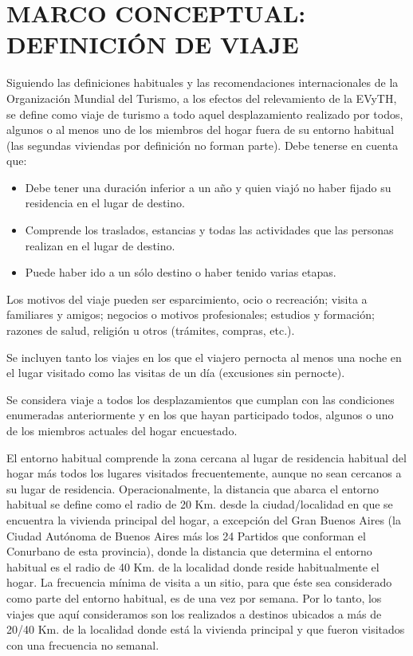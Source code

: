 \documentclass[
  openany]{book}
\begin{document}
\hypertarget{marco-conceptual-definiciuxf3n-de-viaje}{%
\section{\texorpdfstring{\textbf{MARCO CONCEPTUAL: DEFINICIÓN DE VIAJE}}{MARCO CONCEPTUAL: DEFINICIÓN DE VIAJE}}\label{marco-conceptual-definiciuxf3n-de-viaje}}

Siguiendo las definiciones habituales y las recomendaciones internacionales de la Organización Mundial del Turismo, a los efectos del relevamiento de la EVyTH, se define como viaje de turismo a todo aquel desplazamiento realizado por todos, algunos o al menos uno de los miembros del hogar fuera de su entorno habitual (las segundas viviendas por definición no forman parte).
Debe tenerse en cuenta que:

\begin{itemize}
\item
  Debe tener una duración inferior a un año y quien viajó no haber fijado su residencia en el lugar de destino.
\item
  Comprende los traslados, estancias y todas las actividades que las personas realizan en el lugar de destino.
\item
  Puede haber ido a un sólo destino o haber tenido varias etapas.
\end{itemize}

Los motivos del viaje pueden ser esparcimiento, ocio o recreación; visita a familiares y amigos; negocios o motivos profesionales; estudios y formación; razones de salud, religión u otros (trámites, compras, etc.).

Se incluyen tanto los viajes en los que el viajero pernocta al menos una noche en el lugar visitado como las visitas de un día (excusiones sin pernocte).

Se considera viaje a todos los desplazamientos que cumplan con las condiciones enumeradas anteriormente y en los que hayan participado todos, algunos o uno de los miembros actuales del hogar encuestado.

El entorno habitual comprende la zona cercana al lugar de residencia habitual del hogar más todos los lugares visitados frecuentemente, aunque no sean cercanos a su lugar de residencia.
Operacionalmente, la distancia que abarca el entorno habitual se define como el radio de 20 Km.
desde la ciudad/localidad en que se encuentra la vivienda principal del hogar, a excepción del Gran Buenos Aires (la Ciudad Autónoma de Buenos Aires más los 24 Partidos que conforman el Conurbano de esta provincia), donde la distancia que determina el entorno habitual es el radio de 40 Km.
de la localidad donde reside habitualmente el hogar.
La frecuencia mínima de visita a un sitio, para que éste sea considerado como parte del entorno habitual, es de una vez por semana.
Por lo tanto, los viajes que aquí consideramos son los realizados a destinos ubicados a más de 20/40 Km.
de la localidad donde está la vivienda principal y que fueron visitados con una frecuencia no semanal.
\end{document}
